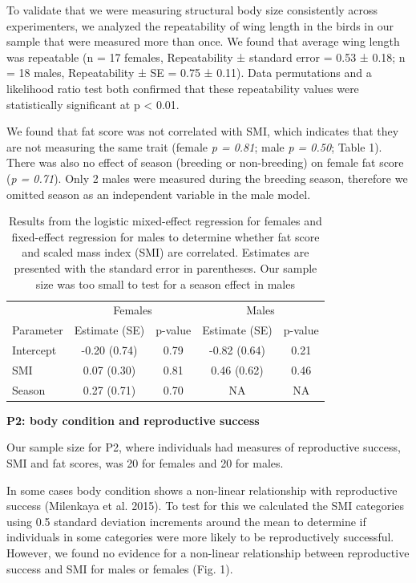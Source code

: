 \documentclass[
]{article}
\begin{document}
To validate that we were measuring structural body size consistently
across experimenters, we analyzed the repeatability of wing length in
the birds in our sample that were measured more than once. We found that
average wing length was repeatable (n = 17 females, Repeatability ±
standard error = 0.53 ± 0.18; n = 18 males, Repeatability ± SE = 0.75 ±
0.11). Data permutations and a likelihood ratio test both confirmed that
these repeatability values were statistically significant at p
\textless{} 0.01.

We found that fat score was not correlated with SMI, which indicates
that they are not measuring the same trait (female \emph{p = 0.81}; male
\emph{p = 0.50}; Table 1). There was also no effect of season (breeding
or non-breeding) on female fat score (\emph{p = 0.71}). Only 2 males
were measured during the breeding season, therefore we omitted season as
an independent variable in the male model.

\begin{table}

\caption{\label{tab:p1 results}Results from the logistic mixed-effect regression for females and fixed-effect regression for males to determine whether fat score and scaled mass index (SMI) are correlated. Estimates are presented with the standard error in parentheses. Our sample size was too small to test for a season effect in males}
\centering
\begin{tabular}[t]{l|c|c|c|c}
\hline
\multicolumn{1}{c|}{ } & \multicolumn{2}{c|}{Females} & \multicolumn{2}{c}{Males} \\
\cline{2-3} \cline{4-5}
Parameter & Estimate (SE) & p-value & Estimate (SE) & p-value\\
\hline
Intercept & -0.20 (0.74) & 0.79 & -0.82 (0.64) & 0.21\\
\hline
SMI & 0.07 (0.30) & 0.81 & 0.46 (0.62) & 0.46\\
\hline
Season & 0.27 (0.71) & 0.70 & NA & NA\\
\hline
\end{tabular}
\end{table}

\textbf{P2: body condition and reproductive success}

Our sample size for P2, where individuals had measures of reproductive
success, SMI and fat scores, was 20 for females and 20 for males.

In some cases body condition shows a non-linear relationship with
reproductive success (Milenkaya et al. 2015). To test for this we
calculated the SMI categories using 0.5 standard deviation increments
around the mean to determine if individuals in some categories were more
likely to be reproductively successful. However, we found no evidence
for a non-linear relationship between reproductive success and SMI for
males or females (Fig. 1).
\end{document}

